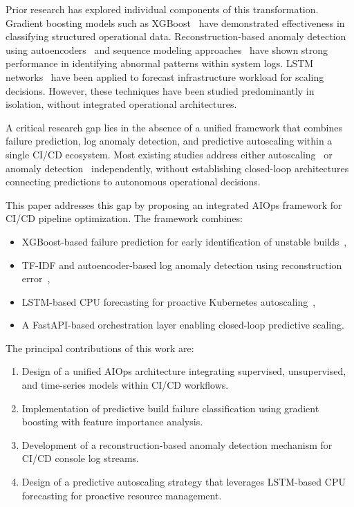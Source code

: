 \documentclass[conference]{IEEEtran}
\begin{document}
Prior research has explored individual components of this transformation. Gradient boosting models such as XGBoost~\cite{chen2016xgboost} have demonstrated effectiveness in classifying structured operational data. Reconstruction-based anomaly detection using autoencoders~\cite{sakurada2014anomaly} and sequence modeling approaches~\cite{du2017deeplog, meng2019loganomaly} have shown strong performance in identifying abnormal patterns within system logs. LSTM networks~\cite{hochreiter1997lstm} have been applied to forecast infrastructure workload for scaling decisions. However, these techniques have been studied predominantly in isolation, without integrated operational architectures.

A critical research gap lies in the absence of a unified framework that combines failure prediction, log anomaly detection, and predictive autoscaling within a single CI/CD ecosystem. Most existing studies address either autoscaling~\cite{lorido2014autoscaling} or anomaly detection~\cite{le2022log} independently, without establishing closed-loop architectures connecting predictions to autonomous operational decisions.

This paper addresses this gap by proposing an integrated AIOps framework for CI/CD pipeline optimization. The framework combines:

\begin{itemize}
    \item XGBoost-based failure prediction for early identification of unstable builds~\cite{chen2016xgboost},
    \item TF-IDF and autoencoder-based log anomaly detection using reconstruction error~\cite{sakurada2014anomaly},
    \item LSTM-based CPU forecasting for proactive Kubernetes autoscaling~\cite{hochreiter1997lstm},
    \item A FastAPI-based orchestration layer enabling closed-loop predictive scaling.
\end{itemize}

The principal contributions of this work are:

\begin{enumerate}
    \item Design of a unified AIOps architecture integrating supervised, unsupervised, and time-series models within CI/CD workflows.
    \item Implementation of predictive build failure classification using gradient boosting with feature importance analysis.
    \item Development of a reconstruction-based anomaly detection mechanism for CI/CD console log streams.
    \item Design of a predictive autoscaling strategy that leverages LSTM-based CPU forecasting for proactive resource management.
\end{enumerate}
\end{document}
